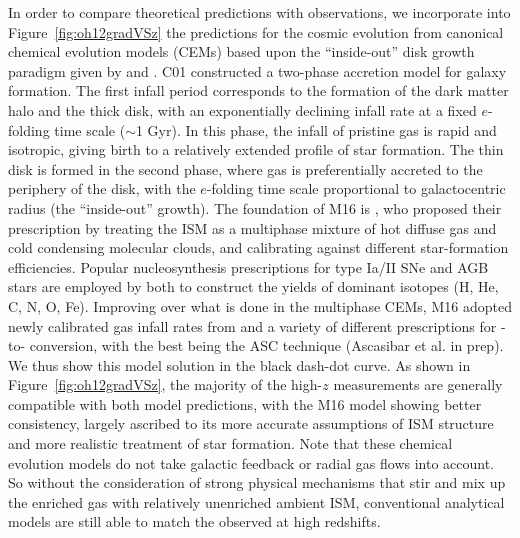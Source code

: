 In order to compare theoretical predictions with observations, we incorporate into Figure~\ref{fig:oh12gradVSz} the predictions
for the \mg cosmic evolution from canonical chemical evolution models (CEMs) based upon the ``inside-out'' disk growth paradigm 
given by
\citet[][C01]{Chiappini:2001ds} and \citet[][M16]{Molla:2016wn,Molla:2016vb}.
C01 constructed a two-phase accretion model for galaxy
formation.  The first infall period corresponds to the formation of the dark matter halo and the thick disk, with an exponentially
declining infall rate at a fixed $e$-folding time scale ($\sim$1 Gyr).  In this phase, the infall of pristine gas is rapid and
isotropic, giving birth to a relatively extended profile of star formation.  The thin disk is formed in the second phase, where
gas is preferentially accreted to the periphery of the disk, with the $e$-folding time scale proportional to galactocentric radius
(\vsv the ``inside-out'' growth).
The foundation of M16 is \citet{Molla:2005eq}, who proposed their prescription by treating the ISM as a multiphase mixture of hot 
diffuse gas and cold condensing molecular clouds, and calibrating against different star-formation efficiencies.
Popular nucleosynthesis prescriptions for type Ia/II SNe and AGB stars are employed by both to construct the yields of dominant 
isotopes (\eg H, He, C, N, O, Fe).
Improving over what is done in the \citet{Molla:2005eq} multiphase CEMs,
M16 adopted newly calibrated gas infall rates from \citet{Molla:2016be} and a variety of different prescriptions for \HI-to-\Htwo 
conversion, with the best being the ASC technique (Ascasibar et al. in prep). We thus show this model solution in the black 
dash-dot curve.
As shown in Figure~\ref{fig:oh12gradVSz}, the majority of the high-$z$
measurements are generally compatible with both model predictions, with the M16 model showing better consistency, largely ascribed
to its more accurate assumptions of ISM structure and more realistic treatment of star formation.  Note that these chemical
evolution models do not take galactic feedback or radial gas flows into account.  So without the consideration of strong physical
mechanisms that stir and mix up the enriched gas with relatively unenriched ambient ISM, conventional analytical models are still
able to match the \mgs observed at high redshifts.

